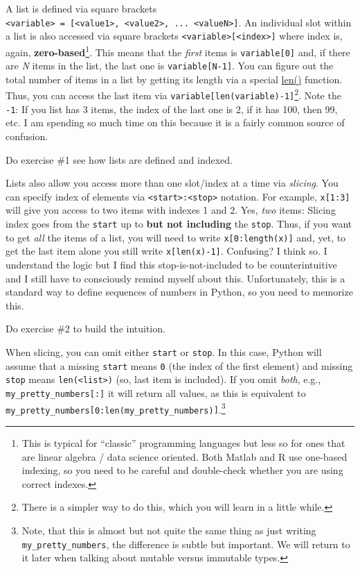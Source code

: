\documentclass[
]{book}
\begin{document}
A list is defined via square brackets \texttt{\textless{}variable\textgreater{}\ =\ {[}\textless{}value1\textgreater{},\ \textless{}value2\textgreater{},\ ...\ \textless{}valueN\textgreater{}{]}}. An individual slot within a list is also accessed via square brackets \texttt{\textless{}variable\textgreater{}{[}\textless{}index\textgreater{}{]}} where index is, again, \textbf{zero-based}\footnote{This is typical for ``classic'' programming languages but less so for ones that are linear algebra / data science oriented. Both Matlab and R use one-based indexing, so you need to be careful and double-check whether you are using correct indexes.}. This means that the \emph{first} items is \texttt{variable{[}0{]}} and, if there are \emph{N} items in the list, the last one is \texttt{variable{[}N-1{]}}. You can figure out the total number of items in a list by getting its length via a special \href{https://docs.python.org/3/library/functions.html\#len}{len()} function. Thus, you can access the last item via \texttt{variable{[}len(variable)-1{]}}\footnote{There is a simpler way to do this, which you will learn in a little while.}. Note the \texttt{-1}: If you list has 3 items, the index of the last one is 2, if it has 100, then 99, etc. I am spending so much time on this because it is a fairly common source of confusion.

Do exercise \#1 see how lists are defined and indexed.

Lists also allow you access more than one slot/index at a time via \emph{slicing}. You can specify index of elements via \texttt{\textless{}start\textgreater{}:\textless{}stop\textgreater{}} notation. For example, \texttt{x{[}1:3{]}} will give you access to two items with indexes 1 and 2. Yes, \emph{two} items: Slicing index goes from the \texttt{start} up to \textbf{but not including} the \texttt{stop}. Thus, if you want to get \emph{all} the items of a list, you will need to write \texttt{x{[}0:length(x){]}} and, yet, to get the last item alone you still write \texttt{x{[}len(x)-1{]}}. Confusing? I think so. I understand the logic but I find this stop-is-not-included to be counterintuitive and I still have to consciously remind myself about this. Unfortunately, this is a standard way to define sequences of numbers in Python, so you need to memorize this.

Do exercise \#2 to build the intuition.

When slicing, you can omit either \texttt{start} or \texttt{stop}. In this case, Python will assume that a missing \texttt{start} means \texttt{0} (the index of the first element) and missing \texttt{stop} means \texttt{len(\textless{}list\textgreater{})} (so, last item is included). If you omit \emph{both}, e.g., \texttt{my\_pretty\_numbers{[}:{]}} it will return all values, as this is equivalent to \texttt{my\_pretty\_numbers{[}0:len(my\_pretty\_numbers){]}}.\footnote{Note, that this is almost but not quite the same thing as just writing \texttt{my\_pretty\_numbers}, the difference is subtle but important. We will return to it later when talking about mutable versus immutable types.}
\end{document}
